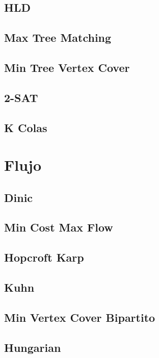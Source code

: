 \documentclass[a4paper,11pt,landscape,twocolumn]{article}
\begin{document}
\subsection{HLD}

\subsection{Max Tree Matching}

\subsection{Min Tree Vertex Cover}

\subsection{2-SAT}

\subsection{K Colas}


\section{Flujo} %
\subsection{Dinic}

\subsection{Min Cost Max Flow}

\subsection{Hopcroft Karp}

\subsection{Kuhn}

\subsection{Min Vertex Cover Bipartito}

\subsection{Hungarian}

\end{document}
